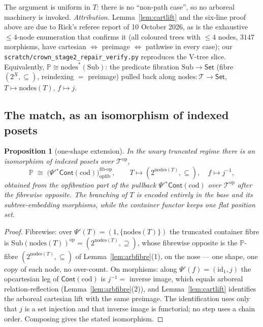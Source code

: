 \documentclass[11pt]{article}
\newtheorem{proposition}[theorem]{Proposition}
\theoremstyle{definition}
\newcommand{\Set}{\mathsf{Set}}
\newcommand{\Cont}{\mathsf{Cont}}
\newcommand{\Sub}{\mathrm{Sub}}
\newcommand{\cod}{\mathrm{cod}}
\newcommand{\nodes}{\mathrm{nodes}}
\newcommand{\id}{\mathrm{id}}
\newcommand{\op}{\mathrm{op}}
\newcommand{\Tree}{\mathcal{T}}
\newcommand{\Pfib}{\mathbb{P}}
\newcommand{\Psip}{\Psi'}
\begin{document}
The argument is uniform in $T$: there is no ``non-path case'', so no arboreal machinery is invoked.
\emph{Attribution.} Lemma~\ref{lem:cartlift} and the six-line proof above are due to Rick's referee
report of 10 October 2026, as is the exhaustive $\le4$-node enumeration that confirms it (all
coloured trees with $\le4$ nodes, $3147$ morphisms, have cartesian $\Leftrightarrow$ preimage
$\Leftrightarrow$ pathwise in every case); our
\texttt{scratch/crown\_stage2\_repair\_verify.py} reproduces the V-tree slice. Equivalently,
$\Pfib\cong\nodes^*(\Sub)$: the predicate fibration $\Sub\to\Set$ (fibre $(2^X,\subseteq)$,
reindexing $=$ preimage) pulled back along $\nodes\colon\Tree\to\Set$, $T\mapsto\nodes(T)$,
$f\mapsto j$.

\subsection{The match, as an isomorphism of indexed posets}

\begin{proposition}[one-shape extension]\label{prop:clause1}
In the unary truncated regime there is an isomorphism of indexed posets over $\Tree^\op$,
\[
\Pfib\;\cong\;\bigl(\Psip{}^*\Cont(\cod)\bigr)^{\mathrm{fib\text{-}op}}_{\mathrm{opfib}},
\qquad
T\longmapsto(2^{\nodes(T)},\subseteq),\quad f\longmapsto j^{-1},
\]
obtained from the \emph{opfibration part} of the pullback $\Psip{}^*\Cont(\cod)$ over $\Tree^\op$
after the fibrewise opposite. The branching of $T$ is encoded entirely in the base and its
subtree-embedding morphisms, while the container functor keeps one flat position set.
\end{proposition}

\begin{proof}
Fibrewise: over $\Psip(T)=(1,\{\nodes(T)\})$ the truncated container fibre is
$\Sub(\nodes(T))^\op=(2^{\nodes(T)},\supseteq)$, whose fibrewise opposite is the $\Pfib$-fibre
$(2^{\nodes(T)},\subseteq)$ of Lemma~\ref{lem:arbfibre}(1), on the nose --- one shape, one copy of
each node, no over-count. On morphisms: along $\Psip(f)=(\id_1,j)$ the opcartesian leg of
$\Cont(\cod)$ is $j^{-1}=$ inverse image, which equals arboreal relation-reflection
(Lemma~\ref{lem:arbfibre}(2)), and Lemma~\ref{lem:cartlift} identifies the arboreal cartesian lift
with the same preimage. The identification uses only that $j$ is a set injection and that inverse
image is functorial; no step uses a chain order. Composing gives the stated isomorphism.
\end{proof}
\end{document}

